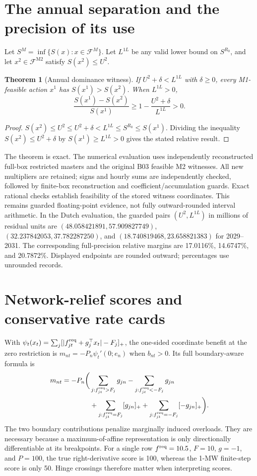 \documentclass[11pt]{article}
\newtheorem{theorem}{Theorem}
\newcommand{\F}{\mathcal F}
\begin{document}
\section{The annual separation and the precision of its use}
Let $S^M=\inf\{S(x):x\in\F^M\}$. Let $L^{1L}$ be any valid lower bound on $S^{R_0}$, and let $x^2\in\F^{\mathrm{M2}}$ satisfy $S(x^2)\leq U^2$.
\begin{theorem}[Annual dominance witness]
If $U^2+\delta<L^{1L}$ with $\delta\geq0$, every M1-feasible action $x^1$ has $S(x^1)>S(x^2)$. When $L^{1L}>0$,
\begin{equation}
\frac{S(x^1)-S(x^2)}{S(x^1)}\geq 1-\frac{U^2+\delta}{L^{1L}}>0.
\end{equation}
\end{theorem}
\begin{proof}
$S(x^2)\leq U^2\leq U^2+\delta<L^{1L}\leq S^{R_0}\leq S(x^1)$. Dividing the inequality $S(x^2)\leq U^2+\delta$ by $S(x^1)\geq L^{1L}>0$ gives the stated relative result.
\end{proof}
The theorem is exact. The numerical evaluation uses independently reconstructed full-box restricted masters and the original B03 feasible M2 witnesses. All new multipliers are retained; signs and hourly sums are independently checked, followed by finite-box reconstruction and coefficient/accumulation guards. Exact rational checks establish feasibility of the stored witness coordinates. This remains guarded floating-point evidence, not fully outward-rounded interval arithmetic. In the Dutch evaluation, the guarded pairs $(U^2,L^{1L})$ in millions of residual units are $(48.058421891,57.909827749)$, $(32.237842053,37.782287250)$, and $(18.740819468,23.658821383)$ for 2029--2031. The corresponding full-precision relative margins are 17.0116\%, 14.6747\%, and 20.7872\%. Displayed endpoints are rounded outward; percentages use unrounded records.

\section{Network-relief scores and conservative rate cards}
With $\psi_t(x_t)=\sum_j[|f_{jt}^{\rm req}+g_j^\top x_t|-F_j]_+$, the one-sided coordinate benefit at the zero restriction is $m_{nt}=-P_n\psi_t'(0;e_n)$ when $b_{nt}>0$. Its full boundary-aware formula is
\begin{align}
 m_{nt}=-P_n\bigg(&\sum_{j:f_{jt}^{\rm req}>F_j}g_{jn}-\sum_{j:f_{jt}^{\rm req}<-F_j}g_{jn}\notag\\
&+\sum_{j:f_{jt}^{\rm req}=F_j}[g_{jn}]_+
+\sum_{j:f_{jt}^{\rm req}=-F_j}[-g_{jn}]_+\bigg).
\end{align}
The two boundary contributions penalize marginally induced overloads. They are necessary because a maximum-of-affine representation is only directionally differentiable at its breakpoints. For a single row $f^{\rm req}=10.5$, $F=10$, $g=-1$, and $P=100$, the true right-derivative score is 100, whereas the 1-MW finite-step score is only 50. Hinge crossings therefore matter when interpreting scores.
\end{document}
